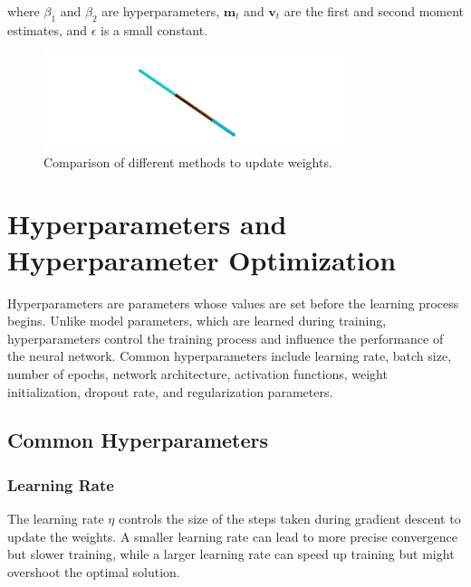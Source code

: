 \documentclass{report}
\begin{document}
            where \( \beta_1 \) and \( \beta_2 \) are hyperparameters, \( \mathbf{m}_t \) and \( \mathbf{v}_t \) are the first and second moment estimates, and \( \epsilon \) is a small constant.
            
            \begin{figure}[h]
                \centering
                \includegraphics[width=0.8\textwidth]{00_Images/00_Velocity.png}
                \caption{Comparison of different methods to update weights.}
                \label{fig:update_methods}
            \end{figure}

    \section{Hyperparameters and Hyperparameter Optimization}

        Hyperparameters are parameters whose values are set before the learning process begins. Unlike model parameters, which are learned during training, hyperparameters control the training process and influence the performance of the neural network. Common hyperparameters include learning rate, batch size, number of epochs, network architecture, activation functions, weight initialization, dropout rate, and regularization parameters.
        
        \subsection{Common Hyperparameters}
        
        \subsubsection{Learning Rate}
        
        The learning rate \( \eta \) controls the size of the steps taken during gradient descent to update the weights. A smaller learning rate can lead to more precise convergence but slower training, while a larger learning rate can speed up training but might overshoot the optimal solution.
        
\end{document}
